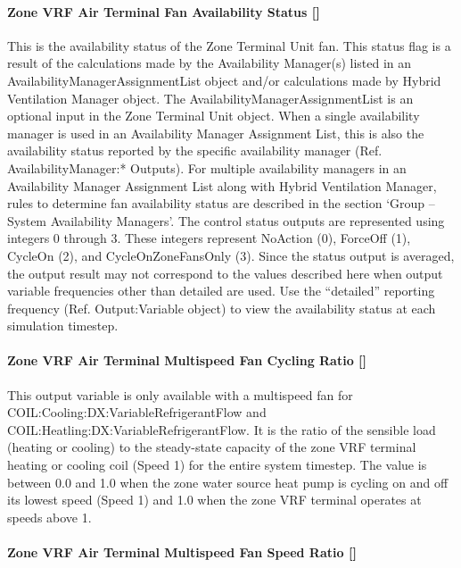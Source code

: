 \paragraph{Zone VRF Air Terminal Fan Availability Status {[]}}\label{zone-vrf-air-terminal-fan-availability-status}

This is the availability status of the Zone Terminal Unit fan. This status flag is a result of the calculations made by the Availability Manager(s) listed in an AvailabilityManagerAssignmentList object and/or calculations made by Hybrid Ventilation Manager object. The AvailabilityManagerAssignmentList is an optional input in the Zone Terminal Unit object. When a single availability manager is used in an Availability Manager Assignment List, this is also the availability status reported by the specific availability manager (Ref. AvailabilityManager:* Outputs). For multiple availability managers in an Availability Manager Assignment List along with Hybrid Ventilation Manager, rules to determine fan availability status are described in the section `Group -- System Availability Managers'. The control status outputs are represented using integers 0 through 3. These integers represent NoAction (0), ForceOff (1), CycleOn (2), and CycleOnZoneFansOnly (3). Since the status output is averaged, the output result may not correspond to the values described here when output variable frequencies other than detailed are used. Use the ``detailed'' reporting frequency (Ref. Output:Variable object) to view the availability status at each simulation timestep.

\paragraph{Zone VRF Air Terminal Multispeed Fan Cycling Ratio {[]}}\label{zone-vrf-air-terminal-multispeed-fan-cycling-ratio}

This output variable is only available with a multispeed fan for COIL:Cooling:DX:VariableRefrigerantFlow and COIL:Heatling:DX:VariableRefrigerantFlow. It is the ratio of the sensible load (heating or cooling) to the steady-state capacity of the zone VRF terminal heating or cooling coil (Speed 1) for the entire system timestep. The value is between 0.0 and 1.0 when the zone water source heat pump is cycling on and off its lowest speed (Speed 1) and 1.0 when the zone VRF terminal operates at speeds above 1.

\paragraph{Zone VRF Air Terminal Multispeed Fan Speed Ratio {[]}}\label{zone-vrf-air-terminal-multispeed-fan-speed-ratio}

